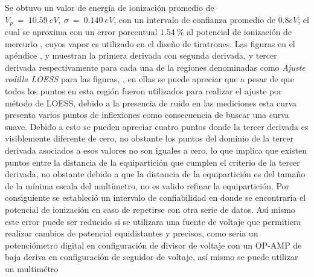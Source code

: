 Se obtuvo un valor de energía de ionización promedio de $V_{p}\ =\ 	10.59\ eV,\ \sigma\ =\ 0.140\ eV$, con un intervalo de confianza promedio de $0.8 eV$; el cual se aproxima con un error porcentual $1.54\ \%$ al potencial de ionización de mercurio \cite{lide}, cuyos vapor es utilizado en el diseño de tiratrones. Las figuras \ut{\ref{fig:potderps1} - \ref{fig:potderps10}} en el apéndice , y \ut{\ref{fig:potderst1} - \ref{fig:potderst10}}   muestran la primera derivada con segunda derivada,  y tercer derivada respectivamente  para cada una de la regiones denominadas como \textit{Ajuste rodilla LOESS} para las figuras, \ut{\ref{fig:pot1} - \ref{fig:pot10}}, en ellas se puede apreciar que a pesar de que todos los puntos en esta región fueron utilizados para realizar el ajuste por método de LOESS, debido a la presencia de ruido en las mediciones esta curva presenta varios puntos de inflexiones como consecuencia de buscar una curva suave. Debido a esto se pueden apreciar cuatro puntos donde la tercer derivada es visiblemente diferente de cero, no obstante los puntos del dominio de la tercer derivada asociados a esos valores no son iguales a cero, lo que implica que existen puntos entre la distancia de la equipartición que cumplen el criterio de la tercer derivada, no obstante debido a que la distancia de la equipartición es del tamaño de la mínima escala del multímetro, no es valido refinar la equipartición. Por consiguiente se estableció un intervalo de confiabilidad en donde se encontraría el potencial de ionización en caso de repetirse con otra serie de datos. Así mismo este error puede ser reducido si se utilizara una fuente de voltaje que permitiera realizar cambios de potencial equidistantes y precisos, como seria un potenciómetro digital en configuración de divisor de voltaje con un OP-AMP de baja deriva  en configuración de seguidor de voltaje, así mismo se puede utilizar un multimétro 

\onecolumngrid

